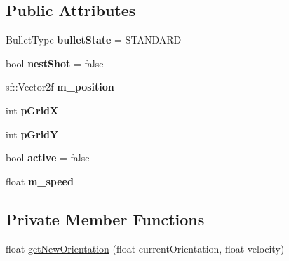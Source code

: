 \subsection*{Public Attributes}
\begin{DoxyCompactItemize}
\item 
\mbox{\label{class_bullet_ad813e052994dc9e8a7d2de8b60d01e29}} 
Bullet\+Type {\bfseries bullet\+State} = S\+T\+A\+N\+D\+A\+RD
\item 
\mbox{\label{class_bullet_a4d75dff91affd24dbff56416a535d0eb}} 
bool {\bfseries nest\+Shot} = false
\item 
\mbox{\label{class_bullet_a68d311a87ea5a50966fbfa6ace4cbb21}} 
sf\+::\+Vector2f {\bfseries m\+\_\+position}
\item 
\mbox{\label{class_bullet_a9d63ff903e36d4ad9b5500c540024c36}} 
int {\bfseries p\+GridX}
\item 
\mbox{\label{class_bullet_ab8ef313cda95604f6c1de8ecf0ddc3de}} 
int {\bfseries p\+GridY}
\item 
\mbox{\label{class_bullet_af049bb84d3cafeb49adbcc65939e111f}} 
bool {\bfseries active} = false
\item 
\mbox{\label{class_bullet_ad596674fc2b3b7fb355a4ad2ca289a8b}} 
float {\bfseries m\+\_\+speed}
\end{DoxyCompactItemize}
\subsection*{Private Member Functions}
\begin{DoxyCompactItemize}
\item 
float \mbox{\hyperlink{class_bullet_a60bd50aace6a584421fe9012ff45aa4e}{get\+New\+Orientation}} (float current\+Orientation, float velocity)
\end{DoxyCompactItemize}

